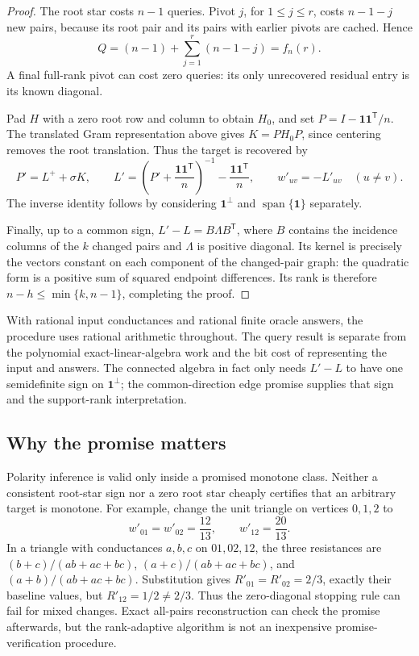 \documentclass[11pt,letterpaper]{article}
\newcommand{\one}{\mathbf 1}
\begin{document}
\begin{proof}
The root star costs $n-1$ queries. Pivot $j$, for $1\le j\le r$, costs $n-1-j$ new pairs, because its root pair and its pairs with earlier pivots are cached. Hence
\[
 Q=(n-1)+\sum_{j=1}^r(n-1-j)=f_n(r).
\]
A final full-rank pivot can cost zero queries: its only unrecovered residual entry is its known diagonal.

Pad $H$ with a zero root row and column to obtain $H_0$, and set $P=I-\one\one^{\mathsf T}/n$. The translated Gram representation above gives $K=PH_0P$, since centering removes the root translation. Thus the target is recovered by
\[
 P'=L^++\sigma K,\qquad
 L'=\left(P'+\frac{\one\one^{\mathsf T}}n\right)^{-1}
       -\frac{\one\one^{\mathsf T}}n,\qquad
 w'_{uv}=-L'_{uv}\quad(u\ne v).
\]
The inverse identity follows by considering $\one^\perp$ and $\operatorname{span}\{\one\}$ separately.

Finally, up to a common sign, $L'-L=B\Lambda B^{\mathsf T}$, where $B$ contains the incidence columns of the $k$ changed pairs and $\Lambda$ is positive diagonal. Its kernel is precisely the vectors constant on each component of the changed-pair graph: the quadratic form is a positive sum of squared endpoint differences. Its rank is therefore $n-h\le\min\{k,n-1\}$, completing the proof.
\end{proof}

With rational input conductances and rational finite oracle answers, the procedure uses rational arithmetic throughout. The query result is separate from the polynomial exact-linear-algebra work and the bit cost of representing the input and answers. The connected algebra in fact only needs $L'-L$ to have one semidefinite sign on $\one^\perp$; the common-direction edge promise supplies that sign and the support-rank interpretation.

\subsection{Why the promise matters}
Polarity inference is valid only inside a promised monotone class. Neither a consistent root-star sign nor a zero root star cheaply certifies that an arbitrary target is monotone. For example, change the unit triangle on vertices $0,1,2$ to
\[
 w'_{01}=w'_{02}=\frac{12}{13},\qquad w'_{12}=\frac{20}{13}.
\]
In a triangle with conductances $a,b,c$ on $01,02,12$, the three resistances are $(b+c)/(ab+ac+bc)$, $(a+c)/(ab+ac+bc)$, and $(a+b)/(ab+ac+bc)$. Substitution gives $R'_{01}=R'_{02}=2/3$, exactly their baseline values, but $R'_{12}=1/2\ne2/3$. Thus the zero-diagonal stopping rule can fail for mixed changes. Exact all-pairs reconstruction can check the promise afterwards, but the rank-adaptive algorithm is not an inexpensive promise-verification procedure.
\end{document}
